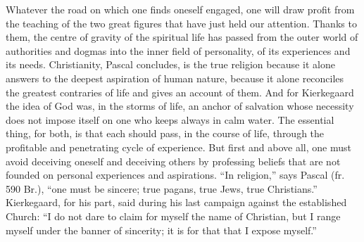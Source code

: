 \documentclass[12pt,a4paper]{article}
\newcommand{\opage}[1]{\marginnote{\footnotesize\textit{[#1]}}}
\begin{document}
Whatever the road on which one finds oneself engaged, one will draw profit from
the teaching of the two great figures that have just held our attention. Thanks
to them, the centre of gravity of the spiritual life has passed from the outer
world of authorities and dogmas into the inner field of personality, of its
experiences and its needs. Christianity, Pascal concludes, is the true religion
\opage{245}because it alone answers to the deepest aspiration of human nature, because it
alone reconciles the greatest contraries of life and gives an account of them.
And for Kierkegaard the idea of God was, in the storms of life, an anchor of
salvation whose necessity does not impose itself on one who keeps always in calm
water. The essential thing, for both, is that each should pass, in the course of
life, through the profitable and penetrating cycle of experience. But first and
above all, one must avoid deceiving oneself and deceiving others by professing
beliefs that are not founded on personal experiences and aspirations. ``In
religion,'' says Pascal (fr. 590 Br.), ``one must be sincere; true pagans, true
Jews, true Christians.'' Kierkegaard, for his part, said during his last campaign
against the established Church: ``I do not dare to claim for myself the name of
Christian, but I range myself under the banner of sincerity; it is for that that
I expose myself.''
\end{document}
